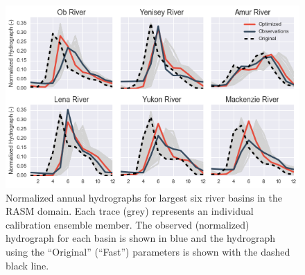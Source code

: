 \documentclass[jgrga, draft]{agutex}
\begin{document}
\clearpage
\begin{figure}
\noindent\includegraphics[width=40pc,natwidth=1]{calibration_hydrographs}
\caption{Normalized annual hydrographs for largest six river basins in the RASM domain.
Each trace (grey) represents an individual calibration ensemble member.
The observed (normalized) hydrograph for each basin is shown in blue and the hydrograph using the ``Original'' (``Fast'') parameters is shown with the dashed black line.}
\label{fig:calibration_hydrographs}
\end{figure}
\end{document}
